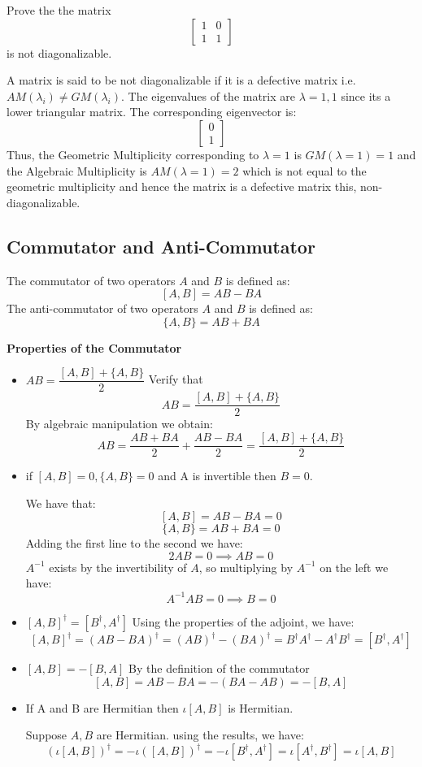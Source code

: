 \begin{example}
    Prove the the matrix
    \[
    \begin{bmatrix} 1 & 0 \\ 1 & 1 \end{bmatrix}
    \]
    is not diagonalizable.

    A matrix is said to be not diagonalizable if it is a defective matrix i.e. $AM(\lambda_i)\neq GM(\lambda_i)$. The eigenvalues of the matrix are $\lambda=1,1$ since its a lower triangular matrix. The corresponding eigenvector is:
    \[
    \begin{bmatrix} 0 \\1 \end{bmatrix}
    \]
    Thus, the Geometric Multiplicity corresponding to $\lambda=1$ is $GM(\lambda=1)=1$ and the Algebraic Multiplicity is $AM(\lambda=1)=2$ which is not equal to the geometric multiplicity and hence the matrix is a defective matrix this, non-diagonalizable.
\end{example}
\subsection{Commutator and Anti-Commutator}
\begin{definition}
    The commutator of two operators $A$ and $B$ is defined as:
    \[ [A,B]=AB-BA \]
    The anti-commutator of two operators $A$ and $B$ is defined as:
    \[ \{A,B\}=AB+BA \]
\end{definition}
\textbf{Properties of the Commutator}
\begin{itemize}
    \item $AB=\dfrac{[A,B]+\{A,B\}}{2}$
    Verify that
    \[
    AB=\frac{[A,B]+\{A,B\}}{2}
    \]
    By algebraic manipulation we obtain:
    \[
    AB=\frac{AB+BA}{2}+\frac{AB-BA}{2}=\frac{[A,B]+\{A,B\}}{2}
    \]

    \item if $[A,B]=0,\{A,B\}=0$ and A is invertible then $B=0$.

    We have that:
    \[
    [A,B]=AB-BA=0
    \]
    \[
    \{A,B\}=AB+BA=0
    \]
    Adding the first line to the second we have:
    \[
    2AB=0 \implies AB=0
    \]
    $A^{-1}$ exists by the invertibility of $A$, so multiplying by $A^{-1}$ on the left we have:
    \[
    A^{-1}AB=0 \implies B=0
    \]
    \item $[A,B]^{\dagger}=[B^{\dagger},A^{\dagger}]$
    Using the properties of the adjoint, we have:
    \[
    [A,B]^{\dagger}=(AB-BA)^{\dagger}=(AB)^{\dagger}-(BA)^{\dagger}=B^{\dagger}A^{\dagger}-A^{\dagger}B^{\dagger}=[B^{\dagger},A^{\dagger}]
    \]
    \item $[A,B]=-[B,A]$
    By the definition of the commutator
    \[
    [A,B]=AB-BA=-(BA-AB)=-[B,A]
    \]
    \item If A and B are Hermitian then $\iota [A,B]$ is Hermitian.

    Suppose $A,B$ are Hermitian. using the results, we have:
    \[
    (\iota[A,B])^{\dagger}=-\iota([A,B])^{\dagger}=-\iota[B^{\dagger},A^{\dagger}]=\iota[A^{\dagger},B^{\dagger}] =\iota[A,B]
    \]
\end{itemize}


